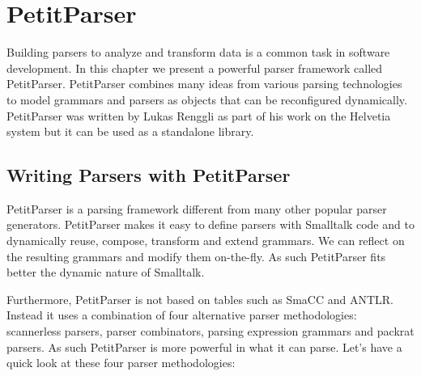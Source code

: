 \documentclass[a4paper,10pt,twoside]{book}
\begin{document}
\fi
\sloppy
\chapter{PetitParser}

\chapterauthor{\authorlukas{}}

\newcommand{\ppmthind}[1]{\clsmthind{PPParser}{#1}}

Building parsers to analyze and transform data is a common task in
software development. In this chapter we present a powerful parser
framework called PetitParser. PetitParser combines many ideas from
various parsing technologies to model grammars and parsers as objects
that can be reconfigured dynamically. PetitParser was written by Lukas
Renggli as part of his work on the Helvetia system but it can be used
as a standalone library.

\section{Writing Parsers with PetitParser}

PetitParser is a parsing framework different from many other popular
parser generators. PetitParser makes it easy to define parsers with
Smalltalk code and to dynamically reuse, compose, transform and extend
grammars. We can reflect on the resulting grammars and modify them
on-the-fly. As such PetitParser fits better the dynamic nature of
Smalltalk.

Furthermore, PetitParser is not based on tables such as SmaCC and
ANTLR. Instead it uses a combination of four alternative parser
methodologies: scannerless parsers, parser combinators, parsing
expression grammars and packrat parsers. As such PetitParser is more
powerful in what it can parse. Let's have a quick look at these four
parser methodologies:
\end{document}
